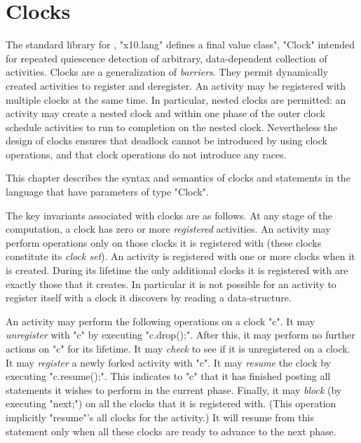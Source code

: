 \chapter{Clocks}\label{XtenClocks}

The standard library for \Xten{}, \xcd"x10.lang" defines a
final value class", \xcd"Clock" intended for repeated quiescence detection
of arbitrary, data-dependent collection of activities. Clocks are a
generalization of {\em barriers}. They permit dynamically created
activities to register and deregister. An activity may be registered
with multiple clocks at the same time. In particular, nested clocks
are permitted: an activity may create a nested clock and within one
phase of the outer clock schedule activities to run to completion on
the nested clock.  Nevertheless the design of clocks ensures that
deadlock cannot be introduced by using clock operations, and that
clock operations do not introduce any races.

This chapter describes the syntax and semantics of clocks and
statements in the language that have parameters of type \xcd"Clock". 

The key invariants associated with clocks are as follows.  At any
stage of the computation, a clock has zero or more {\em registered}
activities. An activity may perform operations only on those clocks it
is registered with (these clocks constitute its {\em clock set}).  An
activity is registered with one or more clocks when it is created.
During its lifetime the only additional clocks it is registered with
are exactly those that it creates. In particular it is not possible
for an activity to register itself with a clock it discovers by
reading a data-structure.

An activity may perform the following operations on a clock \xcd"c".
It may {\em unregister} with \xcd"c" by executing \xcd"c.drop();".
After this, it may perform no further actions on \xcd"c"
for its lifetime. It may {\em check} to see if it is unregistered on a
clock. It may {\em register} a newly forked activity with \xcd"c".
It may {\em resume} the clock by executing \xcd"c.resume();". This
indicates to \xcd"c" that it has finished posting all statements it
wishes to perform in the current phase. Finally, it may {\em block}
(by executing \xcd"next;") on all the clocks that it is registered
with. (This operation implicitly \xcd"resume"'s all clocks for the
activity.) It will resume from this statement only when all these
clocks are ready to advance to the next phase.

